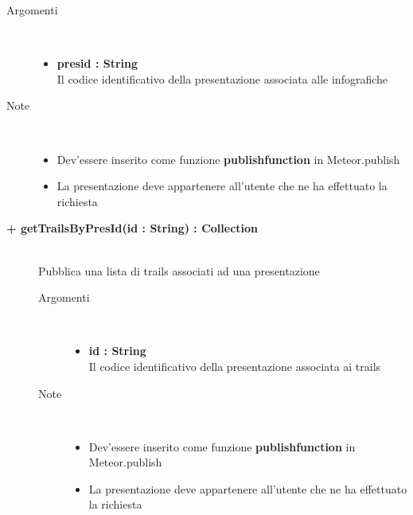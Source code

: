\begin{description}
\begin{description}
		\begin{description}
			\item[Argomenti] \hfill \\
				\begin{itemize}
				
					\item \textbf{presid : String			} \hfill \\
					Il codice identificativo della presentazione associata alle infografiche
					
				\end{itemize}
			\item[Note] \hfill \\
			\begin{itemize}
					\item Dev'essere inserito come funzione \textbf{publishfunction} in Meteor.publish
					\item La presentazione deve appartenere all'utente che ne ha effettuato la richiesta
				\end{itemize}
		\end{description}
	\end{description}
	
	\begin{description}
		\item[\textbf{\color{blue}+ getTrailsByPresId(id : String) : Collection			}] \hfill \\
			Pubblica una lista di trails associati ad una presentazione
			
		\begin{description}
			\item[Argomenti] \hfill \\
				\begin{itemize}
				
					\item \textbf{id : String			} \hfill \\
					Il codice identificativo della presentazione associata ai trails
					
				\end{itemize}
			\item[Note] \hfill \\
			\begin{itemize}
					\item Dev'essere inserito come funzione \textbf{publishfunction} in Meteor.publish
					\item La presentazione deve appartenere all'utente che ne ha effettuato la richiesta
				\end{itemize}
		\end{description}
	\end{description}
	

\end{description}
